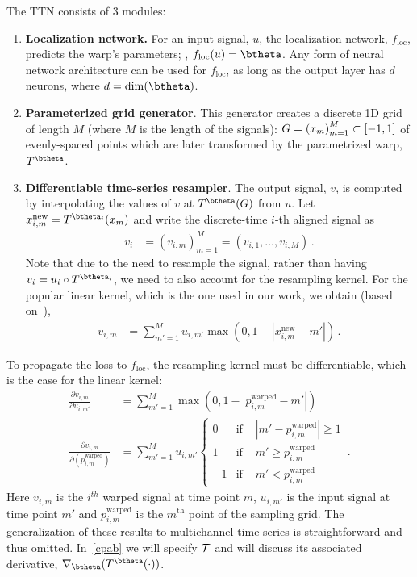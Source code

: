 The TTN consists of 3 modules:
\begin{enumerate}[leftmargin=.5cm]
%
 \item \textbf{Localization network.} For an input signal, $u$, the localization network, $f_{\mathrm{loc}}$, predicts the warp's parameters; \ie, $f_{\mathrm{loc}}(u)=\btheta$. 
 Any form of neural network architecture can be used for  $f_{\mathrm{loc}}$, 
 as long as the output layer has $d$ 
 neurons, where $d=\dim(\btheta)$.
 \item \textbf{Parameterized grid generator}. This generator creates a discrete 1D grid 
 of length $M$ (where $M$ is the length of the signals):
 $G={(x_m)}_{m=1}^M\subset[-1,1]$ of evenly-spaced points which are later transformed by the parametrized warp, $T^\btheta$.
 \item \textbf{Differentiable time-series resampler}. The output signal, $v$, is computed 
 by interpolating the values of $v$ at $T^\btheta(G)$ from $u$.
Let $x_{i,m}^{\mathrm{new}} = T^{\btheta_i}(x_m)$ and write the discrete-time $i$-th aligned signal
as
\begin{align}
 v_i &= (v_{i,m})_{m=1}^M=(v_{i,1},\ldots,v_{i,M})\, .
\end{align} 
Note that due to the need to resample the  signal,
rather than having $v_i = u_i \circ T^{\btheta_i}$, we need to also account for the resampling kernel. 
For the popular linear kernel, which is the one used in our work, we obtain (based on~\cite{Jaderberg:NIPS:2015:spatial}),
\begin{align}
   v_{i,m} &= \sum_{m'=1}^M u_{i,m'} \max(0, 1 - |x_{i,m}^{\mathrm{new}}  -m'|) \, .
\end{align}
%
\end{enumerate}
To propagate the loss to $f_{\mathrm{loc}}$, the resampling kernel must be differentiable, 
which is the case for the linear kernel:
 \begin{align}
   \frac{\partial v_{i,m}}{\partial u_{i,m'}  }  &= \sum_{m'=1}^M \max(0, 1 - |p_{i,m}^{\mathrm{warped}}  -m'|) \\ 
     \frac{\partial v_{i,m}}{\partial (p_{i,m}^{\mathrm{warped}})  }  &= 
     \sum_{m'=1}^M u_{i,m'} 
     \left\{
     \begin{matrix}
 0 & \text{if }& |m' - p_{i,m}^{\mathrm{warped}}| \ge 1  \\
 1 & \text{if }& m' \ge p_{i,m}^{\mathrm{warped}}  \\
 -1& \text{if }& m' < p_{i,m}^{\mathrm{warped}}
     \end{matrix}
     \right.
     \, .
 \end{align}
Here $v_{i,m}$ is the $i^{th}$ warped signal at time point $m$, $u_{i,m'}$ is the input signal at time point $m'$ and $p_{i,m}^{\mathrm{warped}}$ is the $m^{\text{th}}$ point of the sampling grid.
The generalization of these results to multichannel time series is straightforward and thus omitted. 
In~\autoref{cpab} we will specify $\mathcal{T}$ and will discuss its associated derivative, $\nabla_\btheta (T^{\btheta}( \cdot))$.